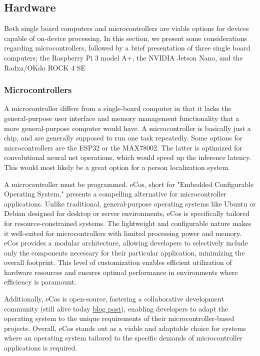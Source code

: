 \subsection{Hardware}
\label{sec:hardware_options}
Both single board computers and microcontrollers are viable options for devices capable of on-device processing. In this section, we present some considerations regarding microcontrollers, followed by a brief presentation of three single board computers; the Raspberry Pi 3 model A+, the NVIDIA Jetson Nano, and the Radxa/OKdo ROCK 4 SE

\subsubsection{Microcontrollers}
A microcontroller differs from a single-board computer in that it lacks the general-purpose user interface and memory management functionality that a more general-purpose computer would have. A microcontroller is basically just a chip, and are generally supposed to run one task repeatedly. Some options for microcontrollers are the ESP32 or the MAX78002. The latter is optimized for convolutional neural net operations, which would speed up the inference latency. This would most likely be a great option for a person localization system. 

A microcontroller must be programmed. eCos, short for "Embedded Configurable Operating System," presents a compelling alternative for microcontroller applications. Unlike traditional, general-purpose operating systems like Ubuntu or Debian designed for desktop or server environments, eCos is specifically tailored for resource-constrained systems. The lightweight and configurable nature makes it well-suited for microcontrollers with limited processing power and memory. eCos provides a modular architecture, allowing developers to selectively include only the components necessary for their particular application, minimizing the overall footprint. This level of customization enables efficient utilization of hardware resources and ensures optimal performance in environments where efficiency is paramount. 

Additionally, eCos is open-source, fostering a collaborative development community (still alive today \href{https://ecos-discuss.ecos.sourceware.narkive.com/IaITkLWC/is-ecos-project-still-alive\#post2}{blog post}), enabling developers to adapt the operating system to the unique requirements of their microcontroller-based projects. Overall, eCos stands out as a viable and adaptable choice for systems where an operating system tailored to the specific demands of microcontroller applications is required.


